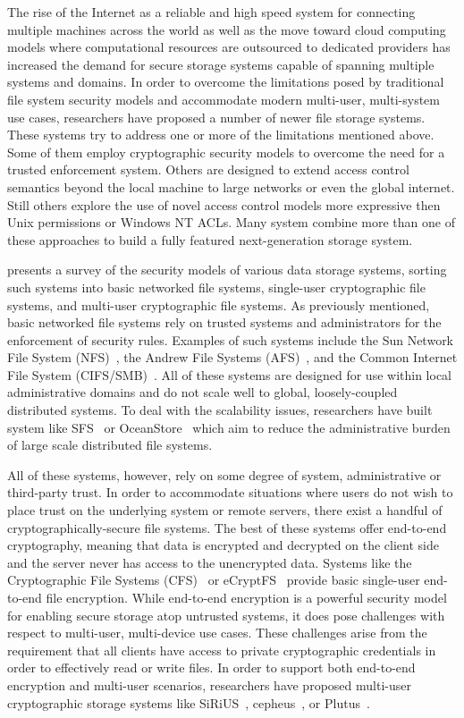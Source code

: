 The rise of the Internet as a reliable and high speed system for
connecting multiple machines across the world as well as the move
toward cloud computing models where computational resources are
outsourced to dedicated providers has increased the demand for secure
storage systems capable of spanning multiple systems and domains. In
order to overcome the limitations posed by traditional file system
security models and accommodate modern multi-user, multi-system use
cases, researchers have proposed a number of newer file storage
systems. These systems try to address one or more of the limitations
mentioned above. Some of them employ cryptographic security models to
overcome the need for a trusted enforcement system. Others are
designed to extend access control semantics beyond the local machine
to large networks or even the global internet. Still others explore
the use of novel access control models more expressive then Unix
permissions or Windows NT ACLs. Many system combine more than one of
these approaches to build a fully featured next-generation storage
system.

\cite{kher2005} presents a survey of the security models of various
data storage systems, sorting such systems into basic networked file
systems, single-user cryptographic file systems, and multi-user
cryptographic file systems. As previously mentioned, basic networked
file systems rely on trusted systems and administrators for the
enforcement of security rules. Examples of such systems include the
Sun Network File System (NFS)~\cite{sandberg1985}, the Andrew File
Systems (AFS)~\cite{howard1988}, and the Common Internet File System
(CIFS/SMB)~\cite{microsoft-smb2}. All of these systems are designed
for use within local administrative domains and do not scale well to
global, loosely-coupled distributed systems. To deal with the
scalability issues, researchers have built system like
SFS~\cite{mazieres1999} or OceanStore~\cite{kubiatowicz2000} which aim
to reduce the administrative burden of large scale distributed file
systems.

All of these systems, however, rely on some degree of system,
administrative or third-party trust. In order to accommodate
situations where users do not wish to place trust on the underlying
system or remote servers, there exist a handful of
cryptographically-secure file systems. The best of these systems offer
end-to-end cryptography, meaning that data is encrypted and decrypted
on the client side and the server never has access to the unencrypted
data.  Systems like the Cryptographic File Systems
(CFS)~\cite{blaze1993} or eCryptFS~\cite{ecryptfs} provide basic
single-user end-to-end file encryption. While end-to-end encryption is
a powerful security model for enabling secure storage atop untrusted
systems, it does pose challenges with respect to multi-user,
multi-device use cases. These challenges arise from the requirement
that all clients have access to private cryptographic credentials in
order to effectively read or write files. In order to support both
end-to-end encryption and multi-user scenarios, researchers have
proposed multi-user cryptographic storage systems like
SiRiUS~\cite{goh2003}, cepheus~\cite{fu1998}, or
Plutus~\cite{kallahalla2003}.

